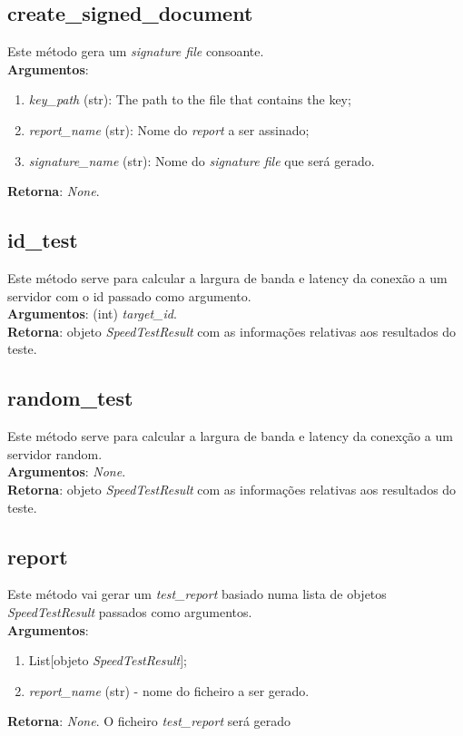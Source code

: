 \documentclass{report}
\begin{document}
\subsection{create\_signed\_document}
\hspace{5mm}Este método gera um \textit{signature file} consoante.\\ 
\hspace{5mm}\textbf{Argumentos}: 
\begin{enumerate}
\item \textit{key\_path} (str): The path to the file that contains the key;
\item \textit{report\_name} (str): Nome do \textit{report} a ser assinado;
\item \textit{signature\_name} (str): Nome do \textit{signature file} que será gerado.	
\end{enumerate}
\textbf{Retorna}: \textit{None}.

\subsection{id\_test}
\hspace{5mm}Este método serve para calcular a largura de banda e latency da conexão a um servidor com o id passado como argumento.\\ 
\hspace{5mm}\textbf{Argumentos}: (int) \textit{target\_id}.\\
\textbf{Retorna}: objeto \textit{SpeedTestResult} com as informações relativas aos resultados do teste.

\subsection{random\_test}
\hspace{5mm}Este método serve para calcular a largura de banda e latency da conexção a um servidor random.\\ 
\hspace{5mm}\textbf{Argumentos}: \textit{None}.\\
\textbf{Retorna}: objeto \textit{SpeedTestResult} com as informações relativas aos resultados do teste.

\subsection{report}
\hspace{5mm}Este método vai gerar um \textit{test\_report} basiado numa lista de objetos \textit{SpeedTestResult} passados como argumentos.\\ 
\textbf{Argumentos}:
\begin{enumerate}
\item List[objeto \textit{SpeedTestResult}];
\item \textit{report\_name} (str) - nome do ficheiro a ser gerado.
\end{enumerate}
\textbf{Retorna}: \textit{None}. O ficheiro \textit{test\_report} será gerado
\end{document}
